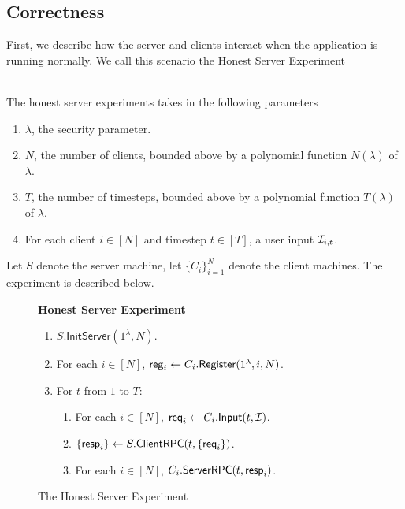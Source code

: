 \subsection{Correctness}
First, we describe how the server and clients interact when the application is running normally. We call this scenario the Honest Server Experiment

\begin{definition}  \hfill\\
\label{defn:messaging-honest-server-experiment}
The honest server experiments takes in the following parameters

\begin{enumerate}
    \item $\lambda$, the security parameter.
    \item $N$, the number of clients, bounded above by a polynomial function $N(\lambda)$ of $\lambda$.
    \item $T$, the number of timesteps, bounded above by a polynomial function $T(\lambda)$ of $\lambda$.
    \item For each client $i \in [N]$ and timestep $t \in [T]$, a user input $\mathcal{I}_{i, t}$.
\end{enumerate}

Let $S$ denote the server machine, let $\{C_i\}_{i = 1}^N$ denote the client machines. The experiment is described below.
\begin{figure}[ht!]
\begin{framed}
\textbf{Honest Server Experiment}
\begin{enumerate}
\item $S.\mathsf{InitServer}(1^{\lambda}, N)$. 
\item For each $i \in [N]$, $\mathsf{reg}_i \leftarrow C_i.\mathsf{Register}(1^{\lambda}, i, N)$. 
\item For $t$ from $1$ to $T$:
    \begin{enumerate}
    \item For each $i \in [N]$, $\mathsf{req}_i \leftarrow C_i.\mathsf{Input}(t, \mathcal{I})$.
    
    \item $\{\mathsf{resp}_i\} \leftarrow S.\mathsf{ClientRPC}(t, \{\mathsf{req}_i\})$.
    
    \item For each $i \in [N]$, $C_i.\mathsf{ServerRPC}(t, \mathsf{resp}_i)$.
    \end{enumerate}
\end{enumerate}
\end{framed}
\label{expr:messaging-honest-server}
\caption{The Honest Server Experiment}
\end{figure}

\end{definition}

